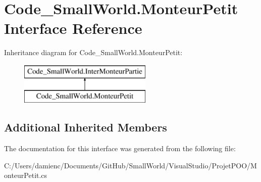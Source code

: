 \hypertarget{interface_code___small_world_1_1_monteur_petit}{\section{Code\-\_\-\-Small\-World.\-Monteur\-Petit Interface Reference}
\label{interface_code___small_world_1_1_monteur_petit}
}
Inheritance diagram for Code\-\_\-\-Small\-World.\-Monteur\-Petit\-:\begin{figure}[H]
\begin{center}
\leavevmode
\includegraphics[height=2.000000cm]{interface_code___small_world_1_1_monteur_petit}
\end{center}
\end{figure}
\subsection*{Additional Inherited Members}


The documentation for this interface was generated from the following file\-:\begin{DoxyCompactItemize}
\item 
C\-:/\-Users/damienc/\-Documents/\-Git\-Hub/\-Small\-World/\-Visual\-Studio/\-Projet\-P\-O\-O/Monteur\-Petit.\-cs\end{DoxyCompactItemize}
